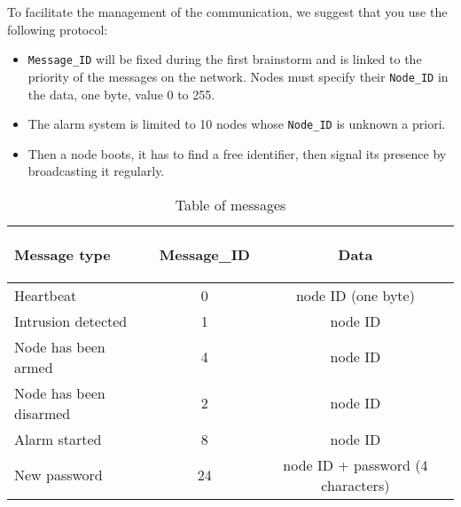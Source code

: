 \documentclass[10pt,a4paper]{article}
\theoremstyle{definition}%
\begin{document}
To facilitate the management of the communication, we suggest that you use the following
protocol:
\begin{itemize}
\item \texttt{Message\_ID} will be fixed during the first brainstorm and is linked to the priority of the messages on the network. Nodes must specify their \texttt{Node\_ID} in the data, one byte, value 0 to 255.
\item The alarm system is limited to 10 nodes whose  \texttt{Node\_ID} is unknown a priori.
\item Then a node boots, it has to find a free identifier, then signal its presence by broadcasting
it regularly.
\end{itemize}

\begin{table} [ht]   %
					\begin{center}
						\begin{tabular}{|l|c|c|}
								\hline
								\begin{bf}Message type\end{bf}&\begin{bf}Message\_ID\end{bf}&\begin{bf}Data\end{bf}\\
								\hline
								Heartbeat& 0 &node ID (one byte)\\
								\hline
								Intrusion detected& 1 &node ID\\
								\hline
								Node has been armed& 4 &node ID\\
								\hline
								Node has been disarmed& 2 &node ID\\
								\hline
								Alarm started& 8 &node ID\\
								\hline
								New password & 24 &node ID + password (4 characters)\\
								\hline
						\end{tabular}
					\end{center}
					\caption{Table of messages}
					\label{Table of messages}
					\end{table}
\end{document}
